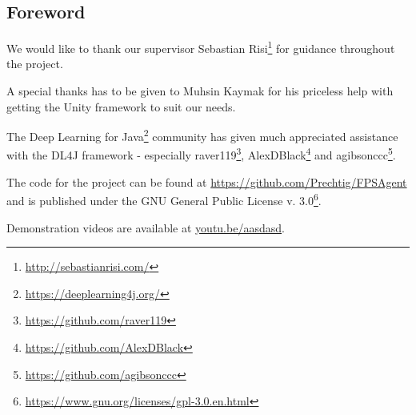 
\begin{center}
\section*{Foreword}
\vspace{1em}
\end{center}


\noindent
We would like to thank our supervisor Sebastian Risi\footnote{\url{http://sebastianrisi.com/}} for guidance throughout the project.

A special thanks has to be given to Muhsin Kaymak for his priceless help with getting the Unity framework to suit our needs.

The Deep Learning for Java\footnote{\url{https://deeplearning4j.org/}} community has given much appreciated assistance with the DL4J framework - especially raver119\footnote{\url{https://github.com/raver119}}, AlexDBlack\footnote{\url{https://github.com/AlexDBlack}} and agibsonccc\footnote{\url{https://github.com/agibsonccc}}.

\vspace{5mm}

\noindent
The code for the project can be found at \url{https://github.com/Prechtig/FPSAgent} and is published under the GNU General Public License v. 3.0\footnote{\url{https://www.gnu.org/licenses/gpl-3.0.en.html}}.

\vspace{5mm}

\noindent
Demonstration videos are available at \url{youtu.be/aasdasd}.

\restoregeometry








